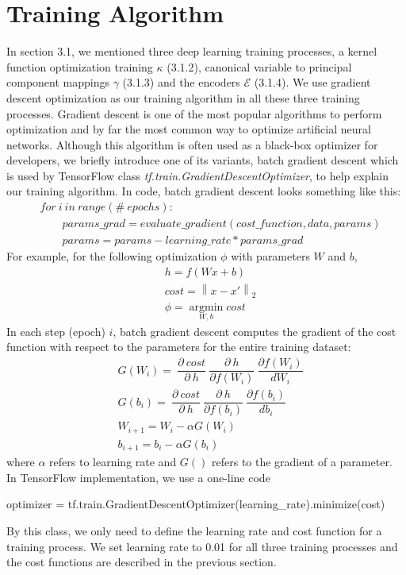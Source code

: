 \documentclass[12pt]{report} %
\newcommand{\norm}[1]{\left\lVert #1 \right\rVert}
\begin{document}
\section{Training Algorithm}
In section 3.1, we mentioned three deep learning training processes, a kernel function optimization training $\kappa$ (3.1.2), canonical variable to principal component mappings $\gamma$ (3.1.3) and the encoders $\mathcal{E}$ (3.1.4). We use gradient descent optimization\cite{GDO} as our training algorithm in all these three training processes. Gradient descent is one of the most popular algorithms to perform optimization and by far the most common way to optimize artificial neural networks. Although this algorithm is often used as a black-box optimizer for developers, we briefly introduce one of its variants, batch gradient descent which is used by TensorFlow class \textit{tf.train.GradientDescentOptimizer}\cite{TFGDO}, to help explain our training algorithm. In code, batch gradient descent looks something like this:
\begin{equation}
\begin{split}
&for\ i\ in\ range ( \#\ epochs ): \\
&\qquad params\_grad = evaluate\_gradient ( cost\_function , data , params ) \\
&\qquad params = params - learning\_rate * params\_grad
\end{split}
\end{equation}
For example, for the following optimization $\phi$ with parameters $W$ and $b$,
\begin{equation}
\begin{split}
&h=f(Wx +b)\\
&cost=\norm{x-x'}_2\\
&\phi=\operatorname*{argmin}_{W,b}cost
\end{split}
\end{equation}
In each step (epoch) $i$, batch gradient descent computes the gradient of the cost function with respect to the parameters for the entire training dataset:
\begin{equation}
\begin{split}
&G({W_i})=\ \dfrac{\partial\ cost}{\partial\ h}\ \dfrac{\partial\ h}{\partial f(W_i)}\ \dfrac{\partial f(W_i)}{dW_i} \\
&G({b_i}) =\ \dfrac{\partial\ cost}{\partial\ h}\ \dfrac{\partial\ h}{\partial f(b_i)}\ \dfrac{\partial f(b_i)}{db_i} \\
&W_{i+1}=W_i - \alpha G(W_i) \\
&b_{i+1}=b_i - \alpha G(b_i)
\end{split}
\end{equation}
where $\alpha$ refers to learning rate and $G()$ refers to the gradient of a parameter. In TensorFlow implementation, we use a one-line code
\begin{center}
optimizer = tf.train.GradientDescentOptimizer(learning\_rate).minimize(cost)
\end{center}
By this class, we only need to define the learning rate and cost function for a training process. We set learning rate to 0.01 for all three training processes and the cost functions are described in the previous section.
\end{document}
